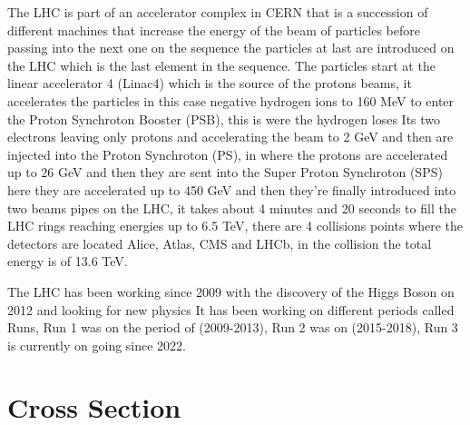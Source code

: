 The LHC is part of an accelerator complex in CERN that is a succession of different machines that increase the energy of the beam of particles before passing into the next one on the sequence the particles at last are introduced on the LHC which is the last element in the sequence. The particles start at the linear accelerator 4 (Linac4) which is the source of the protons beams, it accelerates the particles in this case negative hydrogen ions to 160 MeV to enter the Proton Synchroton Booster (PSB), this is were the hydrogen loses Its two electrons leaving only protons and accelerating the beam to 2 GeV  and then are injected into the Proton Synchroton (PS), in where the protons are accelerated up to 26 GeV and then they are sent into the Super Proton Synchroton (SPS) here they are accelerated up to 450 GeV and then they're finally introduced into two beams pipes on the LHC, it takes about 4 minutes and 20 seconds to fill the LHC rings reaching energies up to 6.5 TeV, there are 4 collisions points where the detectors are located Alice, Atlas, CMS and LHCb, in the collision the total energy is of 13.6 TeV. \cite{LHCII}

The LHC has been working since 2009 with the discovery of the Higgs Boson on 2012 and looking for new physics It has been working on different periods called Runs, Run 1 was on the period of (2009-2013), Run 2 was on (2015-2018), Run 3 is currently on going since 2022. 

\section{Cross Section}


